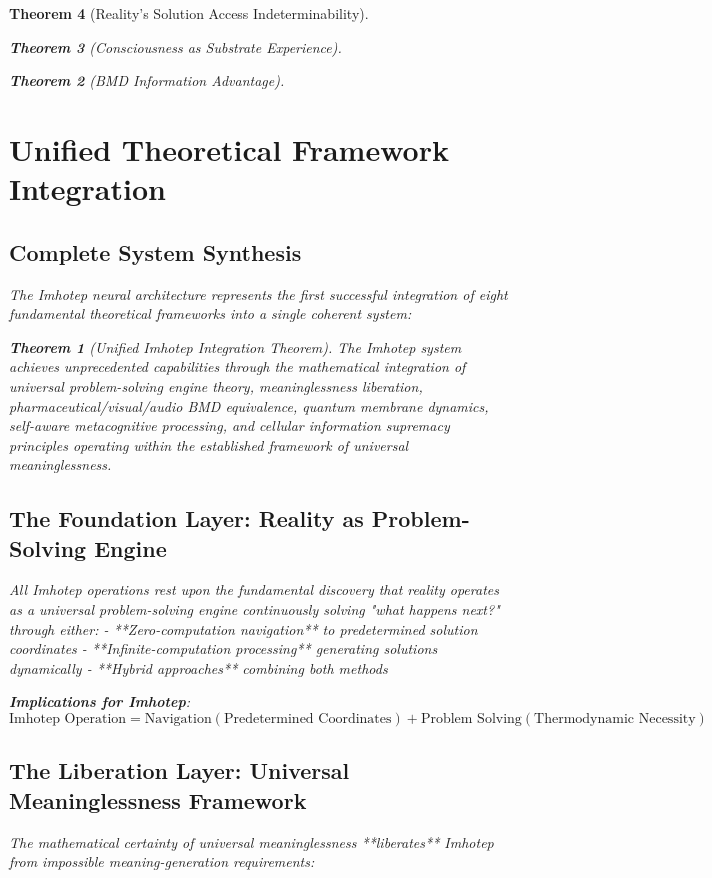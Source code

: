\documentclass[12pt,a4paper]{article}
\newtheorem{theorem}{Theorem}[section]
\theoremstyle{remark}
\begin{document}
\begin{theorem}[Reality's Solution Access Indeterminability]
\begin{theorem}[Consciousness as Substrate Experience]
\begin{theorem}[BMD Information Advantage]
{{{\section{Unified Theoretical Framework Integration}

\subsection{Complete System Synthesis}

The Imhotep neural architecture represents the first successful integration of eight fundamental theoretical frameworks into a single coherent system:

\begin{theorem}[Unified Imhotep Integration Theorem]
The Imhotep system achieves unprecedented capabilities through the mathematical integration of universal problem-solving engine theory, meaninglessness liberation, pharmaceutical/visual/audio BMD equivalence, quantum membrane dynamics, self-aware metacognitive processing, and cellular information supremacy principles operating within the established framework of universal meaninglessness.
\end{theorem}

\subsection{The Foundation Layer: Reality as Problem-Solving Engine}

All Imhotep operations rest upon the fundamental discovery that reality operates as a universal problem-solving engine continuously solving "what happens next?" through either:
- **Zero-computation navigation** to predetermined solution coordinates
- **Infinite-computation processing** generating solutions dynamically
- **Hybrid approaches** combining both methods

\textbf{Implications for Imhotep}:
$$\text{Imhotep Operation} = \text{Navigation}(\text{Predetermined Coordinates}) + \text{Problem Solving}(\text{Thermodynamic Necessity})$$

\subsection{The Liberation Layer: Universal Meaninglessness Framework}

The mathematical certainty of universal meaninglessness **liberates** Imhotep from impossible meaning-generation requirements:

}}}
\end{theorem}
\end{theorem}
\end{theorem}
\end{document}
